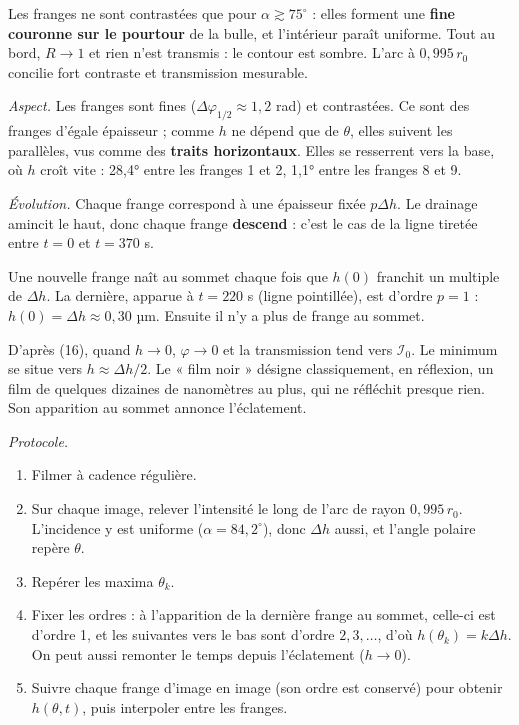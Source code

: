 \documentclass[11pt,a4paper]{article}
\providecommand{\tightlist}{\setlength{\itemsep}{0pt}\setlength{\parskip}{0pt}}
\begin{document}
Les franges ne sont contrastées que pour \(\alpha\gtrsim75^\circ\) : elles forment une \textbf{fine couronne sur le pourtour} de la bulle, et l'intérieur paraît uniforme. Tout au bord, \(R\to1\) et rien n'est transmis : le contour est sombre. L'arc à \(0{,}995\,r_0\) concilie fort contraste et transmission mesurable.

\emph{Aspect.} Les franges sont fines (\(\Delta\varphi_{1/2}\approx1{,}2\) rad) et contrastées. Ce sont des franges d'égale épaisseur ; comme \(h\) ne dépend que de \(\theta\), elles suivent les parallèles, vus comme des \textbf{traits horizontaux}. Elles se resserrent vers la base, où \(h\) croît vite : 28,4° entre les franges 1 et 2, 1,1° entre les franges 8 et 9.

\emph{Évolution.} Chaque frange correspond à une épaisseur fixée \(p\Delta h\). Le drainage amincit le haut, donc chaque frange \textbf{descend} : c'est le cas de la ligne tiretée entre \(t=0\) et \(t=370\) s.

Une nouvelle frange naît au sommet chaque fois que \(h(0)\) franchit un multiple de \(\Delta h\). La dernière, apparue à \(t=220\) s (ligne pointillée), est d'ordre \(p=1\) : \(h(0)=\Delta h\approx0{,}30\) µm. Ensuite il n'y a plus de frange au sommet.

D'après (16), quand \(h\to0\), \(\varphi\to0\) et la transmission tend vers \(\mathcal I_0\). Le minimum se situe vers \(h\approx\Delta h/2\). Le « film noir » désigne classiquement, en réflexion, un film de quelques dizaines de nanomètres au plus, qui ne réfléchit presque rien. Son apparition au sommet annonce l'éclatement.

\emph{Protocole.}

\begin{enumerate}
\def\labelenumi{\arabic{enumi}.}
\tightlist
\item
  Filmer à cadence régulière.
\item
  Sur chaque image, relever l'intensité le long de l'arc de rayon \(0{,}995\,r_0\). L'incidence y est uniforme (\(\alpha=84{,}2^\circ\)), donc \(\Delta h\) aussi, et l'angle polaire repère \(\theta\).
\item
  Repérer les maxima \(\theta_k\).
\item
  Fixer les ordres : à l'apparition de la dernière frange au sommet, celle-ci est d'ordre 1, et les suivantes vers le bas sont d'ordre \(2,3,\dots\), d'où \(h(\theta_k)=k\Delta h\). On peut aussi remonter le temps depuis l'éclatement (\(h\to0\)).
\item
  Suivre chaque frange d'image en image (son ordre est conservé) pour obtenir \(h(\theta,t)\), puis interpoler entre les franges.
\end{enumerate}
\end{document}
